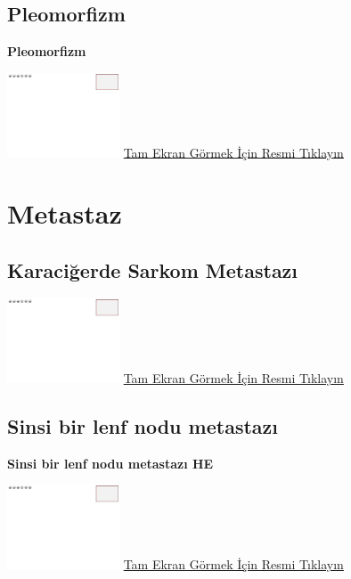 \documentclass[
  letterpaper,
  DIV=11,
  numbers=noendperiod]{scrreprt}
\begin{document}
\hypertarget{sec-pleomorfizm}{%
\section{Pleomorfizm}\label{sec-pleomorfizm}}

\textbf{Pleomorfizm}

\href{https://images.patolojiatlasi.com/template/HE.html}{\includegraphics[width=0.25\textwidth,height=\textheight]{./screenshots/template_screenshot.png}}
\href{https://images.patolojiatlasi.com/pleomorphism/HE.html}{Tam Ekran
Görmek İçin Resmi Tıklayın}

\hypertarget{sec-metastaz}{%
\chapter{Metastaz}\label{sec-metastaz}}

\hypertarget{sec-karaciger-sarkom-metastaz}{%
\section{Karaciğerde Sarkom
Metastazı}\label{sec-karaciger-sarkom-metastaz}}

\href{https://images.patolojiatlasi.com/template/HE.html}{\includegraphics[width=0.25\textwidth,height=\textheight]{./screenshots/template_screenshot.png}}
\href{https://images.patolojiatlasi.com/metastaticsarcoma/HE.html}{Tam
Ekran Görmek İçin Resmi Tıklayın}

\hypertarget{sec-sinsi-lenf-nodu-metastazi}{%
\section{Sinsi bir lenf nodu
metastazı}\label{sec-sinsi-lenf-nodu-metastazi}}

\textbf{Sinsi bir lenf nodu metastazı HE}

\href{https://images.patolojiatlasi.com/template/HE.html}{\includegraphics[width=0.25\textwidth,height=\textheight]{./screenshots/template_screenshot.png}}
\href{https://images.patolojiatlasi.com/insidious-lymph-node-metastasis/HE.html}{Tam
Ekran Görmek İçin Resmi Tıklayın}
\end{document}
